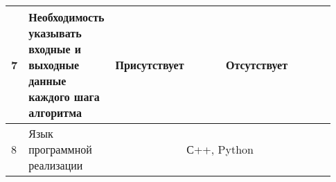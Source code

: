 \begin{landscape}
\begin{longtable}{|p{0.03\linewidth}|p{0.2\linewidth}|p{0.35\linewidth}|p{0.35\linewidth}|}
        7          & Необходимость указывать входные и выходные данные каждого шага алгоритма                   & Присутствует                                                                                                                                                                                                                                                                                                                                                                                                                                                                                                                                                                                                                                                       & Отсутствует                                                                                                                                                                                                                                                                                      \\
        \hline
        8          & Язык программной реализации                                                                & \multicolumn{2}{c|}{С++, Python}                                                                                                                                                                                                                                                                                                                                                                                                                                                                                                                                                                                                                                                                                                                                                                                                                                                                                                                                      \\
        \hline

\end{longtable}
\end{landscape}
